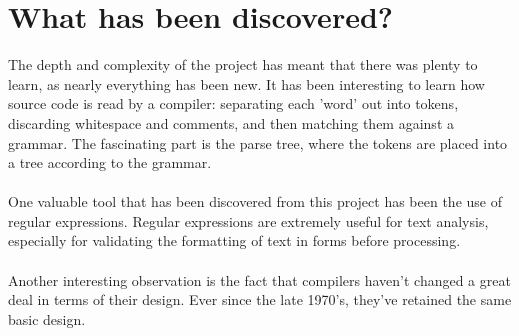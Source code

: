 \documentclass[12pt]{report}
\begin{document}
\section{What has been discovered?}\label{sec:conc:discovered}
The depth and complexity of the project has meant that there was plenty to learn, as nearly everything has been new.  It has been interesting to learn how source code is read by a compiler: separating each 'word' out into tokens, discarding whitespace and comments, and then matching them against a grammar.  The fascinating part is the parse tree, where the tokens are placed into a tree according to the grammar.
\\
\\
One valuable tool that has been discovered from this project has been the use of regular expressions.  Regular expressions are extremely useful for text analysis, especially for validating the formatting of text in forms before processing.\\
\\
Another interesting observation is the fact that compilers haven't changed a great deal in terms of their design.  Ever since the late 1970's, they've retained the same basic design.
\end{document}
